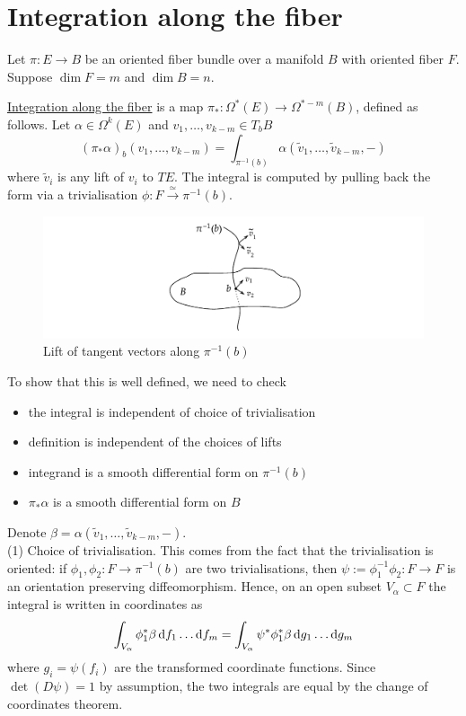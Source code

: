 \section{Integration along the fiber} \label{section:fiber_integration}
Let $\pi: E\to B$ be an oriented fiber bundle over a manifold $B$ with oriented
fiber $F$. Suppose $\dim F = m$ and $\dim B = n$.
\begin{defn}
	\underline{Integration along the fiber} is a map $\pi_* : \Omega^*(E)\to
	\Omega^{*-m}(B)$, defined as follows. Let $\alpha\in \Omega^k(E)$ and
	$v_1,\ldots,v_{k-m} \in T_bB$ 
	\[
	(\pi_*\alpha)_b(v_1,\ldots,v_{k-m}) = \int_{\pi^{-1}(b)}
	\alpha(\widetilde{v}_1,\ldots,\widetilde{v}_{k-m},-)
	\] 
	where $\widetilde{v}_i$ is any lift of $v_i$ to $TE$. 
The integral is computed by pulling back the form via a trivialisation $\phi 
:F \xrightarrow{\simeq} \pi^{-1}(b)$. 
\end{defn}
\begin{figure}[htb]
	\hfill
	\begin{minipage}[c]{0.5\textwidth}
	\includegraphics[trim={5cm 5mm 5cm 3mm},clip,width=\textwidth]{figs/fiber_integral.pdf}
	\end{minipage} 
	\begin{minipage}[c]{0.44\textwidth}
	\caption{Lift of tangent vectors along $\pi^{-1}(b)$}
	\label{fig:fiber_integral}
	\end{minipage} 
\end{figure}
To show that this is well defined, we need to check 
\begin{itemize}
	\item the integral is independent of choice of trivialisation
	\item definition is independent of the choices of lifts
	\item integrand is a smooth differential form on $\pi^{-1}(b)$
	\item $\pi_*\alpha$ is a smooth differential form on $B$
\end{itemize}
Denote $\beta = \alpha(\widetilde{v}_1,\ldots,\widetilde{v}_{k-m},-)$.\\
(1) Choice of trivialisation. This comes from the fact that the trivialisation
is oriented: if $\phi_1,\phi_2 : F \to \pi^{-1}(b)$ are two trivialisations,
then $\psi:=\phi_1^{-1}\phi_2 : F \to F$ is an orientation preserving diffeomorphism. 
Hence, on an open subset $V_\alpha \subset F$ the integral is written in
coordinates as  
\[
\int_{V_{\alpha}} \phi_1^*\beta \odif{f_1}\ldots\odif{f_m} 
= \int_{V_\alpha} \psi^*\phi_1^*\beta  \odif{g_1}\ldots\odif{g_m}
\] 
where $g_i = \psi(f_i)$ are the transformed coordinate functions. Since
$\det(D\psi)=1$ by assumption, the two integrals are equal by the change of 
coordinates theorem. 

